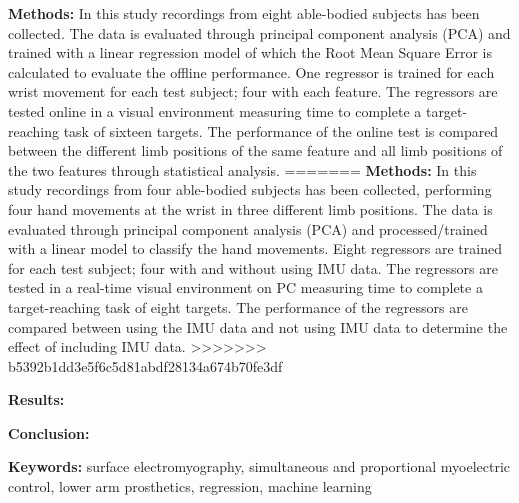 \textbf{Methods:} In this study recordings from eight able-bodied subjects has been collected. The data is evaluated through principal component analysis (PCA) and trained with a linear regression model of which the Root Mean Square Error is calculated to evaluate the offline performance. One regressor is trained for each wrist movement for each test subject; four with each feature. The regressors are tested online in a visual environment measuring time to complete a target-reaching task of sixteen targets. The performance of the online test is compared between the different limb positions of the same feature and all limb positions of the two features through statistical analysis.
=======
\textbf{Methods:} In this study recordings from four able-bodied subjects has been collected, performing four hand movements at the wrist in three different limb positions. The data is evaluated through principal component analysis (PCA) and processed/trained with a linear model to classify the hand movements. Eight regressors are trained for each test subject; four with and without using IMU data. The regressors are tested in a real-time visual environment on PC measuring time to complete a target-reaching task of eight targets. The performance of the regressors are compared between using the IMU data and not using IMU data to determine the effect of including IMU data. 
>>>>>>> b5392b1dd3e5f6c5d81abdf28134a674b70fe3df




\textbf{Results:} 


\textbf{Conclusion:} 


\textbf{Keywords:} surface electromyography, simultaneous and proportional myoelectric control, lower arm prosthetics, regression, machine learning %
